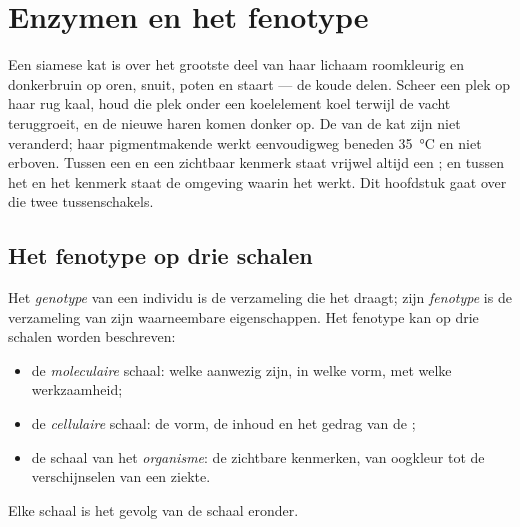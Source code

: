 \chapter{Enzymen en het fenotype}\label{ch:g11:enzymes-and-phenotype}

Een siamese kat is over het grootste deel van haar lichaam roomkleurig en
donkerbruin op oren, snuit, poten en staart --- de koude delen. Scheer een
plek op haar rug kaal, houd die plek onder een koelelement koel terwijl de
vacht teruggroeit, en de nieuwe haren komen donker op. De  van de kat
zijn niet veranderd; haar pigmentmakende  werkt eenvoudigweg beneden
\qty{35}{\celsius} en niet erboven. Tussen een  en een zichtbaar
kenmerk staat vrijwel altijd een ; en tussen het  en het kenmerk
staat de omgeving waarin het werkt. Dit hoofdstuk gaat over die twee
tussenschakels.

\section{Het fenotype op drie schalen}

\begin{definition}\label{def:g11:enzymes-and-phenotype:phenotype}
Het \emph{genotype} van een individu is de verzameling
 die het draagt; zijn \emph{fenotype} is de
verzameling van zijn waarneembare eigenschappen. Het fenotype kan op drie
schalen worden beschreven:
\begin{itemize}
  \item de \emph{moleculaire} schaal: welke  aanwezig zijn, in
        welke vorm, met welke werkzaamheid;
  \item de \emph{cellulaire} schaal: de vorm, de inhoud en het gedrag van
        de ;
  \item de schaal van het \emph{organisme}: de zichtbare kenmerken, van
        oogkleur tot de verschijnselen van een ziekte.
\end{itemize}
Elke schaal is het gevolg van de schaal eronder.
\end{definition}

